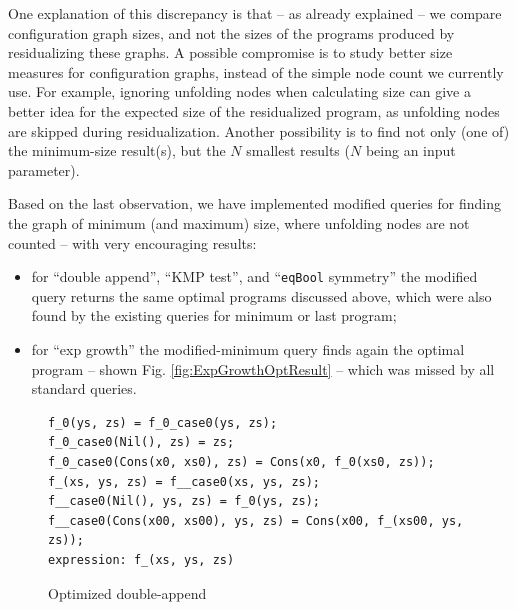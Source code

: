 \documentclass[submission,copyright,creativecommons]{eptcs}
\begin{document}
\begin{itemize}
    One explanation of this discrepancy is that -- as already explained -- we compare configuration graph sizes, and not
    the sizes of the programs produced by residualizing these graphs.
    A possible compromise is to study better size measures for configuration graphs, instead
    of the simple node count we currently use.
    For example, ignoring unfolding nodes when calculating size can give a better idea for the expected size
    of the residualized program, as unfolding nodes are skipped during residualization.
    Another possibility is to find not only (one of) the minimum-size result(s), but the $N$ smallest
    results ($N$ being an input parameter).
\end{itemize}
Based on the last observation, we have implemented modified queries for finding the graph of minimum (and maximum) size, where
unfolding nodes are not counted -- with very encouraging results:
\begin{itemize}
  \item for ``double append'', ``KMP test'', and ``\verb|eqBool| symmetry'' the modified query returns
    the same optimal programs discussed above, which were also found by the existing queries for 
    minimum or last program;
  \item for ``exp growth'' the modified-minimum query finds again the optimal program -- shown Fig. \ref{fig:ExpGrowthOptResult}
    -- which was missed by all standard queries.
\end{itemize}

\begin{figure}
\begin{lstlisting}
f_0(ys, zs) = f_0_case0(ys, zs);
f_0_case0(Nil(), zs) = zs;
f_0_case0(Cons(x0, xs0), zs) = Cons(x0, f_0(xs0, zs));
f_(xs, ys, zs) = f__case0(xs, ys, zs);
f__case0(Nil(), ys, zs) = f_0(ys, zs);
f__case0(Cons(x00, xs00), ys, zs) = Cons(x00, f_(xs00, ys, zs));
expression: f_(xs, ys, zs)
\end{lstlisting}
\caption{Optimized double-append}
\label{fig:DoubleAppResult}
\end{figure}
\end{document}

